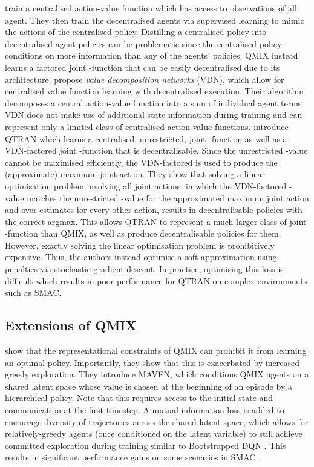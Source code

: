 \documentclass[twoside,11pt]{article}
\begin{document}
\citet{lin2019cesma} train a centralised action-value function  which has access to observations of all agent. They then train the decentralised agents via supervised learning to mimic the actions of the centralised policy. Distilling a centralised policy into decentralised agent policies can be problematic since the centralised policy conditions on more information than any of the agents' policies. QMIX instead learns a factored joint -function that can be easily decentralised due to its architecture.  
\citet{sunehag_value-decomposition_2017} propose \emph{value decomposition 
	networks} (VDN), which allow for centralised value function learning with 
decentralised execution. Their algorithm decomposes a central 
action-value function into a sum of individual agent terms. 
VDN does not make 
use of additional state information during training and can represent only a
limited class of centralised action-value functions.
\citet{son_qtran:_2019} introduce QTRAN which learns a centralised, unrestricted, joint -function as well as a VDN-factored joint -function that is decentralisable. 
Since the unrestricted -value cannot be maximised efficiently, the VDN-factored  is used to produce the (approximate) maximum joint-action. 
They show that solving a linear optimisation problem involving all joint actions, in which the VDN-factored -value matches the unrestricted -value for the approximated maximum joint action and over-estimates for every other action, results in decentralisable policies with the correct argmax.
This allows QTRAN to represent a much larger class of joint -function than QMIX, as well as produce decentralisable policies for them.
However, exactly solving the linear optimisation problem is prohibitively expensive. Thus, the authors instead optimise a soft approximation using  penalties via stochastic gradient descent.
In practice, optimising this loss is difficult which results in poor performance for QTRAN on complex environments such as SMAC.

\subsection{Extensions of QMIX}
\label{sec:rw_qmix}

\citet{mahajan_maven:_2019} show that the representational constraints of QMIX can prohibit it from learning an optimal policy. 
Importantly, they show that this is exacerbated by increased -greedy exploration.
They introduce MAVEN, which conditions QMIX agents on a shared latent space whose value is chosen at the beginning of an episode by a hierarchical policy. Note that this requires access to the initial state and communication at the first timestep.
A mutual information loss is added to encourage diversity of trajectories across the shared latent space, which allows for relatively-greedy agents (once conditioned on the latent variable) to still achieve committed exploration during training similar to Bootstrapped DQN \citep{osband2016deep}.
This results in significant performance gains on some scenarios in SMAC \citep{samvelyan2019starcraft}.
\end{document}

